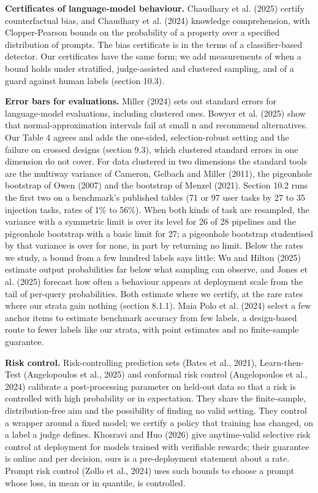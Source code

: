 \documentclass[11pt]{article}
\begin{document}
\textbf{Certificates of language-model behaviour.} Chaudhary et al. (2025) certify counterfactual bias, and Chaudhary et al. (2024) knowledge comprehension, with Clopper-Pearson bounds on the probability of a property over a specified distribution of prompts. The bias certificate is in the terms of a classifier-based detector. Our certificates have the same form; we add measurements of when a bound holds under stratified, judge-assisted and clustered sampling, and of a guard against human labels (section 10.3).


\textbf{Error bars for evaluations.} Miller (2024) sets out standard errors for language-model evaluations, including clustered ones. Bowyer et al. (2025) show that normal-approximation intervals fail at small n and recommend alternatives. Our Table 4 agrees and adds the one-sided, selection-robust setting and the failure on crossed designs (section 9.3), which clustered standard errors in one dimension do not cover. For data clustered in two dimensions the standard tools are the multiway variance of Cameron, Gelbach and Miller (2011), the pigeonhole bootstrap of Owen (2007) and the bootstrap of Menzel (2021). Section 10.2 runs the first two on a benchmark's published tables (71 or 97 user tasks by 27 to 35 injection tasks, rates of 1\% to 56\%). When both kinds of task are resampled, the variance with a symmetric limit is over its level for 26 of 28 pipelines and the pigeonhole bootstrap with a basic limit for 27; a pigeonhole bootstrap studentised by that variance is over for none, in part by returning no limit. Below the rates we study, a bound from a few hundred labels says little: Wu and Hilton (2025) estimate output probabilities far below what sampling can observe, and Jones et al. (2025) forecast how often a behaviour appears at deployment scale from the tail of per-query probabilities. Both estimate where we certify, at the rare rates where our strata gain nothing (section 8.1.1). Maia Polo et al. (2024) select a few anchor items to estimate benchmark accuracy from few labels, a design-based route to fewer labels like our strata, with point estimates and no finite-sample guarantee.


\textbf{Risk control.} Risk-controlling prediction sets (Bates et al., 2021), Learn-then-Test (Angelopoulos et al., 2025) and conformal risk control (Angelopoulos et al., 2024) calibrate a post-processing parameter on held-out data so that a risk is controlled with high probability or in expectation. They share the finite-sample, distribution-free aim and the possibility of finding no valid setting. They control a wrapper around a fixed model; we certify a policy that training has changed, on a label a judge defines. Khosravi and Huo (2026) give anytime-valid selective risk control at deployment for models trained with verifiable rewards; their guarantee is online and per decision, ours is a pre-deployment statement about a rate. Prompt risk control (Zollo et al., 2024) uses such bounds to choose a prompt whose loss, in mean or in quantile, is controlled.
\end{document}
